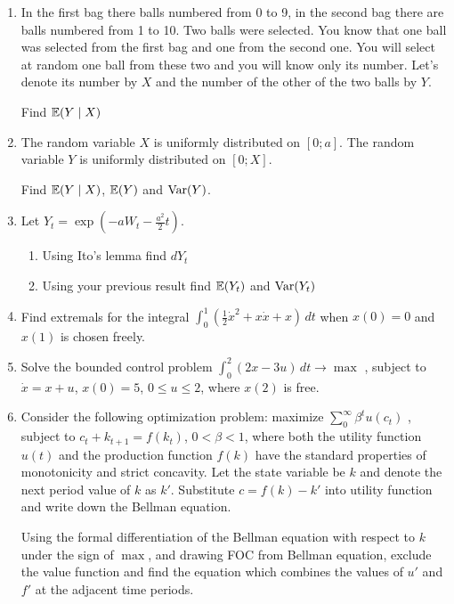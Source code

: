 \documentclass[pdftex,12pt,a4paper]{article}
\begin{document}
\begin{enumerate}
\item In the first bag there balls numbered from 0 to 9, in the second bag there are balls numbered from 1 to 10. Two balls were selected. You know that one ball was selected from the first bag and one from the second one. You will select at random one ball from these two and you will know only its number. Let’s denote its number by $X$ and the number of the other of the two balls by $Y$.

Find $\mathbb{E}(Y\mid X)$ 

\item The random variable $X$ is uniformly distributed on $[0;a]$. The random variable $Y$ is uniformly distributed on $[0;X]$.

Find $\mathbb{E}(Y\mid X)$, $\mathbb{E}(Y)$  and $\operatorname{Var}(Y)$.
\item Let 
$Y_t=\exp\left(-aW_t-\frac{a^2}{2}t\right)$.
\begin{enumerate}
\item Using Ito’s lemma find $dY_t$ 
\item Using your previous result find $\mathbb{E}(Y_t)$ and $\operatorname{Var}(Y_t)$
\end{enumerate}

\item Find extremals for the integral 
$\int_0^1 \left(\frac{1}{2}\dot{x}^2+x\dot{x}+x\right)\, dt$
when $x(0)=0$ and $x(1)$ is chosen freely.

\item Solve the bounded control problem
$\int_0^2 (2x-3u)\,dt \to \max$
, subject to $\dot{x}=x+u$, $x(0)=5$, $0\leq u \leq 2$, where $x(2)$ is free.

\item Consider the following optimization problem: maximize 
$\sum_0^{\infty}\beta^t u(c_t)$
, subject to $c_t+k_{t+1}=f(k_t)$, $0<\beta<1$, where both the utility function $u(t)$  and the production function $f(k)$ have the standard properties of monotonicity and strict concavity. Let the state variable be $k$ and denote the next period value of $k$ as $k'$. Substitute $c=f(k)-k'$ into utility function and write down the Bellman equation.


Using the formal differentiation of the Bellman equation with respect to $k$ under the sign of $\max$, and drawing  FOC from Bellman equation, exclude the value function and find the equation which combines the values of $u'$ and $f'$  at the adjacent time periods.

\end{enumerate}
\end{document}
